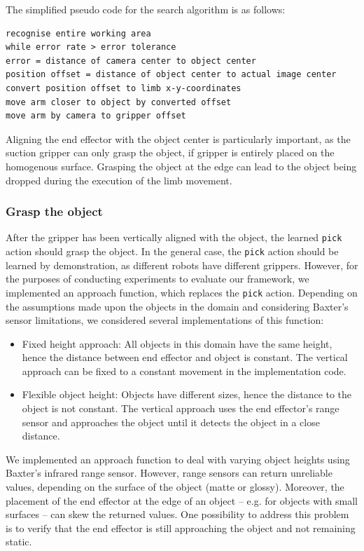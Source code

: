 The simplified pseudo code for the search algorithm is as follows:

\begin{verbatim}
recognise entire working area
while error rate > error tolerance
error = distance of camera center to object center
position offset = distance of object center to actual image center
convert position offset to limb x-y-coordinates
move arm closer to object by converted offset
move arm by camera to gripper offset
\end{verbatim}
Aligning the end effector with the object center is particularly important, as the suction gripper can only grasp the object, if gripper is entirely placed on the homogenous surface.
Grasping the object at the edge can lead to the object being dropped during the execution of the limb movement.

\subsubsection{Grasp the object}
After the gripper has been vertically aligned with the object, the learned \texttt{pick} action should grasp the object.
In the general case, the \texttt{pick} action should be learned by demonstration, as different robots have different grippers.
However, for the purposes of conducting experiments to evaluate our framework, we implemented an approach function, which replaces the \texttt{pick} action.
Depending on the assumptions made upon the objects in the domain and considering Baxter's sensor limitations, we considered several implementations of this function:
\begin{itemize}
	\item Fixed height approach: All objects in this domain have the same height, hence the distance between end effector and object is constant.
	The vertical approach can be fixed to a constant movement in the implementation code.
	\item Flexible object height: Objects have different sizes, hence the distance to the object is not constant.
	The vertical approach uses the end effector's range sensor and approaches the object until it detects the object in a close distance.
\end{itemize}
We implemented an approach function to deal with varying object heights using Baxter's infrared range sensor.
However, range sensors can return unreliable values, depending on the surface of the object (matte or glossy).
Moreover, the placement of the end effector at the edge of an object -- e.g.
for objects with small surfaces -- can skew the returned values.
One possibility to address this problem is to verify that the end effector is still approaching the object and not remaining static.


